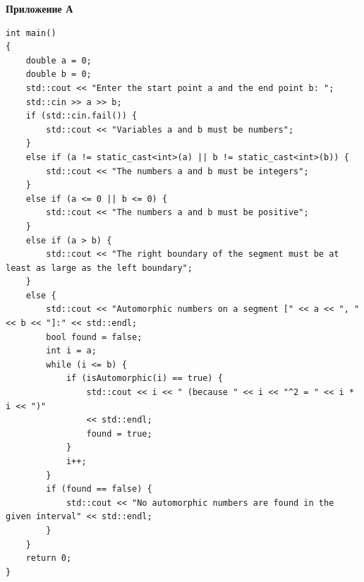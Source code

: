 \documentclass[a4paper, 12pt]{report} %
\begin{document}
	\newpage
	
	\begin{flushright}
		\textbf{Приложение А}
	\end{flushright}
	\begin{lstlisting}[style=cppstyle]
int main()  
{  
	double a = 0; 
	double b = 0; 
	std::cout << "Enter the start point a and the end point b: "; 
	std::cin >> a >> b; 
	if (std::cin.fail()) { 
		std::cout << "Variables a and b must be numbers"; 
	} 
	else if (a != static_cast<int>(a) || b != static_cast<int>(b)) { 
		std::cout << "The numbers a and b must be integers"; 
	} 
	else if (a <= 0 || b <= 0) { 
		std::cout << "The numbers a and b must be positive"; 
	} 
	else if (a > b) { 
		std::cout << "The right boundary of the segment must be at least as large as the left boundary"; 
	} 
	else { 
		std::cout << "Automorphic numbers on a segment [" << a << ", " << b << "]:" << std::endl; 
		bool found = false; 
		int i = a; 
		while (i <= b) { 
			if (isAutomorphic(i) == true) { 
				std::cout << i << " (because " << i << "^2 = " << i * i << ")" 
				<< std::endl; 
				found = true; 
			} 
			i++; 
		} 
		if (found == false) { 
			std::cout << "No automorphic numbers are found in the given interval" << std::endl; 
		} 
	} 
	return 0; 
}
	\end{lstlisting}
\end{document}
